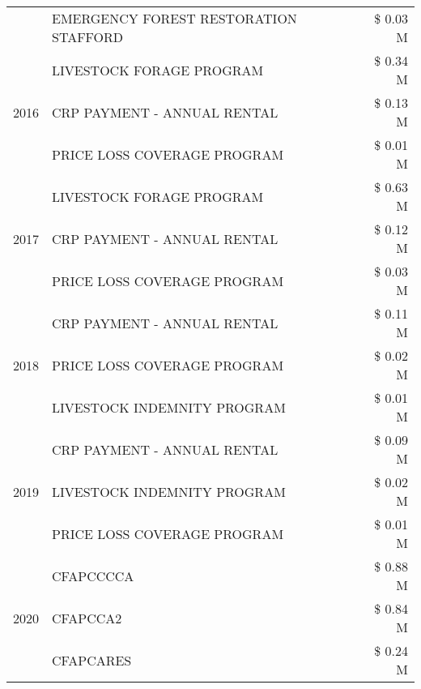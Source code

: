 \begin{tabular}{llr}
 & EMERGENCY FOREST RESTORATION STAFFORD & \$ 0.03 M \\
\cline{1-3}
\multirow[t]{3}{*}{2016} & LIVESTOCK FORAGE PROGRAM & \$ 0.34 M \\
 & CRP PAYMENT - ANNUAL RENTAL & \$ 0.13 M \\
 & PRICE LOSS COVERAGE PROGRAM & \$ 0.01 M \\
\cline{1-3}
\multirow[t]{3}{*}{2017} & LIVESTOCK FORAGE PROGRAM & \$ 0.63 M \\
 & CRP PAYMENT - ANNUAL RENTAL & \$ 0.12 M \\
 & PRICE LOSS COVERAGE PROGRAM & \$ 0.03 M \\
\cline{1-3}
\multirow[t]{3}{*}{2018} & CRP PAYMENT - ANNUAL RENTAL & \$ 0.11 M \\
 & PRICE LOSS COVERAGE PROGRAM & \$ 0.02 M \\
 & LIVESTOCK INDEMNITY PROGRAM & \$ 0.01 M \\
\cline{1-3}
\multirow[t]{3}{*}{2019} & CRP PAYMENT - ANNUAL RENTAL & \$ 0.09 M \\
 & LIVESTOCK INDEMNITY PROGRAM & \$ 0.02 M \\
 & PRICE LOSS COVERAGE PROGRAM & \$ 0.01 M \\
\cline{1-3}
\multirow[t]{3}{*}{2020} & CFAPCCCCA & \$ 0.88 M \\
 & CFAPCCA2 & \$ 0.84 M \\
 & CFAPCARES & \$ 0.24 M \\
\cline{1-3}
\bottomrule
\end{tabular}
